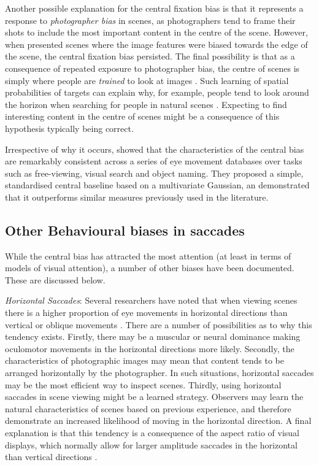 Another possible explanation for the central fixation bias is that it represents a response to \emph{photographer bias} in scenes, as photographers tend to frame their shots to include the most important content in the centre of the scene. However, when \cite{tatler2007} presented scenes where the image features were biased towards the edge of the scene, the central fixation bias persisted. The final possibility is that as a consequence of repeated exposure to photographer bias, the centre of scenes is simply where people are \emph{trained} to look at images \citep{parkhurst2002}. Such learning of spatial probabilities of targets can explain why, for example, people tend to look around the horizon when searching for people in natural scenes \citep{birmingham2009, torralba2006, ehinger2009}. Expecting to find interesting content in the centre of scenes might be a consequence of this hypothesis typically being correct. 

Irrespective of why it occurs, \cite{clarke-tatler2014} showed that the characteristics of the central bias are remarkably consistent across a series of eye movement databases over tasks such as free-viewing, visual search and object naming. They proposed a simple, standardised central baseline based on a multivariate Gaussian, an demonstrated that it outperforms similar measures previously used in the literature.

\subsection{Other Behavioural biases in saccades}
While the central bias has attracted the most attention (at least in terms of models of visual attention), a number of other biases have been documented. These are discussed below. 

\textit{Horizontal Saccades}: Several researchers have noted that when viewing scenes there is a higher proportion of eye movements in horizontal directions than vertical or oblique movements \citep[e.g.][]{gilchrist2006,foulsham2008,tatler2008,lappe1998,lee2002}. There are a number of possibilities as to why this tendency exists. Firstly, there may be a muscular or neural dominance making oculomotor movements in the horizontal directions more likely. Secondly, the characteristics of photographic images may mean that content tends to be arranged horizontally by the photographer. In such situations, horizontal saccades may be the most efficient way to inspect scenes. Thirdly, using horizontal saccades in scene viewing might be a learned strategy. Observers may learn the natural characteristics of scenes based on previous experience, and therefore demonstrate an increased likelihood of moving in the horizontal direction. A final explanation is that this tendency is a consequence of the aspect ratio of visual displays, which normally allow for larger amplitude saccades in the horizontal than vertical directions \citep{wartburg2007}.

